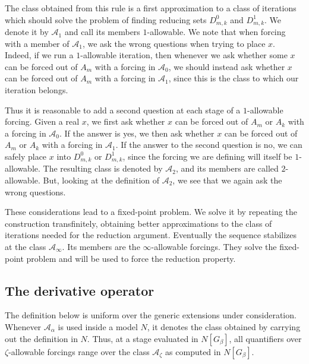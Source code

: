 \documentclass[a4paper,11pt]{article}
\begin{document}
The class obtained from this rule is a first approximation to a class of iterations which should solve the problem of finding reducing sets $D^0_{m,k}$ and $D^1_{m,k}$. We denote it by $\mathcal A_1$ and call its members $1$-allowable. We note that when forcing with a member of $\mathcal A_1$, we ask the wrong questions when trying to place $x$. Indeed, if we run a $1$-allowable iteration, then whenever we ask whether some $x$ can be forced out of $A_m$ with a forcing in $\mathcal A_0$, we should instead ask whether $x$ can be forced out of $A_m$ with a forcing in $\mathcal A_1$, since this is the class to which our iteration belongs.

Thus it is reasonable to add a second question at each stage of a $1$-allowable forcing. Given a real $x$, we first ask whether $x$ can be forced out of $A_m$ or $A_k$ with a forcing in $\mathcal A_0$. If the answer is yes, we then ask whether $x$ can be forced out of $A_m$ or $A_k$ with a forcing in $\mathcal A_1$. If the answer to the second question is no, we can safely place $x$ into $D^0_{m,k}$ or $D^1_{m,k}$, since the forcing we are defining will itself be $1$-allowable. The resulting class is denoted by $\mathcal A_2$, and its members are called $2$-allowable. But, looking at the definition of $\mathcal A_2$, we see that we again ask the wrong questions.

These considerations lead to a fixed-point problem. We solve it by repeating the construction transfinitely, obtaining better approximations to the class of iterations needed for the reduction argument. Eventually the sequence stabilizes at the class $\mathcal A_\infty$. Its members are the $\infty$-allowable forcings. They solve the fixed-point problem and will be used to force the reduction property.

\subsection{The derivative operator}

The definition below is uniform over the generic extensions under consideration. Whenever $\mathcal A_\alpha$ is used inside a model $N$, it denotes the class obtained by carrying out the definition in $N$. Thus, at a stage evaluated in $N[G_\beta]$, all quantifiers over $\zeta$-allowable forcings range over the class $\mathcal A_\zeta$ as computed in $N[G_\beta]$.
\end{document}
